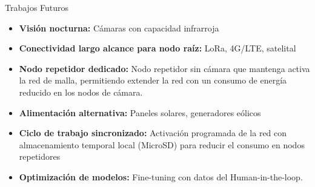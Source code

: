 \documentclass[10pt]{beamer}
\begin{document}
\begin{frame}{Trabajos Futuros}
\begin{itemize}
\setlength{\itemsep}{0.5em}
\item \textbf{Visión nocturna:} Cámaras con capacidad infrarroja
\item \textbf{Conectividad largo alcance para nodo raíz:} LoRa, \num{4}G/LTE, satelital
\item \textbf{Nodo repetidor dedicado:} Nodo repetidor sin cámara que mantenga activa la red de malla, permitiendo extender la red con un consumo de energía reducido en los nodos de cámara.
\item \textbf{Alimentación alternativa:} Paneles solares, generadores eólicos
\item \textbf{Ciclo de trabajo sincronizado:} Activación programada de la red con almacenamiento temporal local (MicroSD) para reducir el consumo en nodos repetidores
\item \textbf{Optimización de modelos:} Fine-tuning con datos del Human-in-the-loop.
\end{itemize}
\end{frame}



\end{document}

